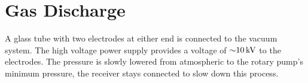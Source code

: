 \chapter{Gas Discharge}

A glass tube with two electrodes at either end is connected to the vacuum system.
The high voltage power supply provides a voltage of $\SI{\sim10}{\kV}$ to the electrodes.
The pressure is slowly lowered from atmospheric to the rotary pump's minimum pressure, the receiver stays connected to slow down this process.
